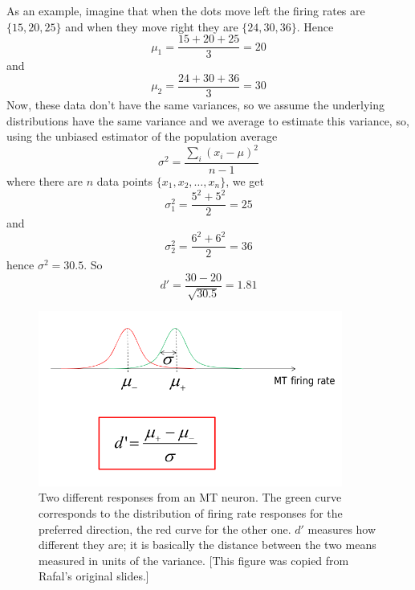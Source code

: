 \documentclass[11pt,a4paper]{scrartcl}
\begin{document}
As an example, imagine that when the dots move left the firing rates
are $\{15,20,25\}$ and when they move right they are
$\{24,30,36\}$. Hence
\begin{equation}
\mu_1=\frac{15+20+25}{3}=20
\end{equation}
and
\begin{equation}
\mu_2=\frac{24+30+36}{3}=30
\end{equation}
Now, these data don't have the same variances, so we assume the
underlying distributions have the same variance and we average to
estimate this variance, so, using the unbiased estimator of the population average
\begin{equation}
\sigma^2=\frac{\sum_i(x_i-\mu)^2}{n-1}
\end{equation}
where there are $n$ data points $\{x_1,x_2,\ldots,x_n\}$, we get
\begin{equation}
\sigma_1^2=\frac{5^2+5^2}{2}=25
\end{equation}
and
\begin{equation}
\sigma_2^2=\frac{6^2+6^2}{2}=36
\end{equation}
hence $\sigma^2=30.5$. So
\begin{equation}
d'=\frac{30-20}{\sqrt{30.5}}=1.81
\end{equation}

\begin{figure}
\begin{center}
\includegraphics[width=10cm]{discrim.png}
\end{center}
\caption{Two different responses from an MT neuron. The green curve
  corresponds to the distribution of firing rate responses for the
  preferred direction, the red curve for the other one. $d'$ measures
  how different they are; it is basically the distance between the two
  means measured in units of the variance. [This figure was copied
  from Rafal's original slides.]\label{discrim}}
\end{figure}
\end{document}
